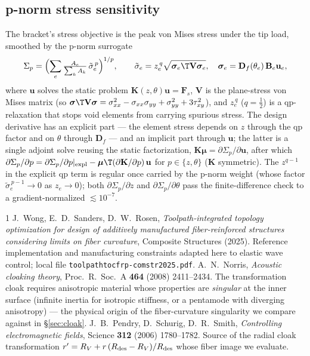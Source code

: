 \documentclass[11pt]{article}
\begin{document}
\subsection{p-norm stress sensitivity}
\label{app:stresssens}
The bracket's stress objective is the peak von Mises stress under the tip load,
smoothed by the p-norm surrogate
\begin{equation}
  \Sigma_p=\Bigl(\sum_e \tfrac{A_e}{\sum_k A_k}\,\tilde\sigma_e^{\,p}\Bigr)^{1/p},
  \qquad
  \tilde\sigma_e=z_e^{\,q}\sqrt{\bm\sigma_e\T\mathbf V\bm\sigma_e},\quad
  \bm\sigma_e=\mathbf D_f(\theta_e)\,\mathbf B_e\mathbf u_e ,
\end{equation}
where $\mathbf u$ solves the static problem $\mathbf K(z,\theta)\mathbf u=\mathbf F_s$,
$\mathbf V$ is the plane-stress von Mises matrix (so
$\bm\sigma\T\mathbf V\bm\sigma=\sigma_{xx}^2-\sigma_{xx}\sigma_{yy}+\sigma_{yy}^2
+3\tau_{xy}^2$), and $z_e^{\,q}$ ($q=\tfrac12$) is a qp-relaxation that stops void
elements from carrying spurious stress. The design derivative has an explicit part ---
the element stress depends on $z$ through the qp factor and on $\theta$ through
$\mathbf D_f$ --- and an implicit part through $\mathbf u$; the latter is a single
adjoint solve reusing the static factorization,
$\mathbf K\bm\mu=\partial\Sigma_p/\partial\mathbf u$, after which
$\partial\Sigma_p/\partial p=\partial\Sigma_p/\partial p|_{\rm expl}
-\bm\mu\T(\partial\mathbf K/\partial p)\,\mathbf u$ for $p\in\{z,\theta\}$
($\mathbf K$ symmetric). The $z^{q-1}$ in the explicit qp term is regular once carried
by the p-norm weight (whose factor $\tilde\sigma_e^{\,p-1}\!\to0$ as $z_e\to0$); both
$\partial\Sigma_p/\partial z$ and $\partial\Sigma_p/\partial\theta$ pass the
finite-difference check to a gradient-normalized $\lesssim10^{-7}$.


\begin{thebibliography}{1}
J.~Wong, E.~D.~Sanders, D.~W.~Rosen,
\emph{Toolpath-integrated topology optimization for design of additively
manufactured fiber-reinforced structures considering limits on fiber curvature},
Composite Structures (2025). Reference implementation and manufacturing
constraints adapted here to elastic wave control; local file
\texttt{toolpathtocfrp-comstr2025.pdf}.
A.~N.~Norris, \emph{Acoustic cloaking theory}, Proc.\ R.\ Soc.\ A \textbf{464}
(2008) 2411--2434. The transformation cloak requires anisotropic material whose
properties are \emph{singular} at the inner surface (infinite inertia for isotropic
stiffness, or a pentamode with diverging anisotropy) --- the physical origin of the
fiber-curvature singularity we compare against in \S\ref{sec:cloak}.
J.~B.~Pendry, D.~Schurig, D.~R.~Smith, \emph{Controlling electromagnetic fields},
Science \textbf{312} (2006) 1780--1782. Source of the radial cloak transformation
$r'=R_V+r\,(R_{\rm des}-R_V)/R_{\rm des}$ whose fiber image we evaluate.
\end{thebibliography}
\end{document}
